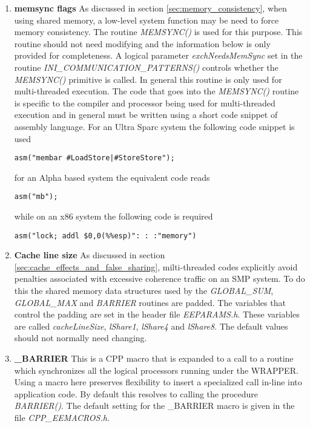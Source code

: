 \begin{enumerate}
\item {\bf memsync flags}
As discussed in section \ref{sec:memory_consistency}, when using shared memory,
a low-level system function may be need to force memory consistency.
The routine {\em MEMSYNC()} is used for this purpose. This routine should
not need modifying and the information below is only provided for
completeness. A logical parameter {\em exchNeedsMemSync} set
in the routine {\em INI\_COMMUNICATION\_PATTERNS()} controls whether
the {\em MEMSYNC()} primitive is called. In general this
routine is only used for multi-threaded execution.
The code that goes into the {\em MEMSYNC()}
 routine is specific to the compiler and
processor being used for multi-threaded execution and in general
must be written using a short code snippet of assembly language.
For an Ultra Sparc system the following code snippet is used
\begin{verbatim}
asm("membar #LoadStore|#StoreStore");
\end{verbatim}
for an Alpha based system the equivalent code reads
\begin{verbatim}
asm("mb");
\end{verbatim}
while on an x86 system the following code is required
\begin{verbatim}
asm("lock; addl $0,0(%%esp)": : :"memory")
\end{verbatim}

\item {\bf Cache line size}
As discussed in section \ref{sec:cache_effects_and_false_sharing},
milti-threaded codes explicitly avoid penalties associated with excessive 
coherence traffic on an SMP system. To do this the shared memory data structures
used by the {\em GLOBAL\_SUM}, {\em GLOBAL\_MAX} and {\em BARRIER} routines
are padded. The variables that control the padding are set in the
header file {\em EEPARAMS.h}. These variables are called
{\em cacheLineSize}, {\em lShare1}, {\em lShare4} and
{\em lShare8}. The default values should not normally need changing.
\item {\bf \_BARRIER}
This is a CPP macro that is expanded to a call to a routine
which synchronizes all the logical processors running under the
WRAPPER. Using a macro here preserves flexibility to insert
a specialized call in-line into application code. By default this
resolves to calling the procedure {\em BARRIER()}. The default
setting for the \_BARRIER macro is given in the file {\em CPP\_EEMACROS.h}.


\end{enumerate}
